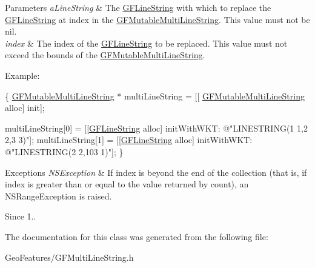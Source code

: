 \begin{DoxyParams}{Parameters}
{\em a\+Line\+String} & The \hyperlink{interface_g_f_line_string}{G\+F\+Line\+String} with which to replace the \hyperlink{interface_g_f_line_string}{G\+F\+Line\+String} at index in the \hyperlink{interface_g_f_mutable_multi_line_string}{G\+F\+Mutable\+Multi\+Line\+String}. This value must not be nil. \\
\hline
{\em index} & The index of the \hyperlink{interface_g_f_line_string}{G\+F\+Line\+String} to be replaced. This value must not exceed the bounds of the \hyperlink{interface_g_f_mutable_multi_line_string}{G\+F\+Mutable\+Multi\+Line\+String}.\\
\hline
\end{DoxyParams}
Example\+:


\begin{DoxyCode}
\{
   \hyperlink{interface_g_f_mutable_multi_line_string}{GFMutableMultiLineString} * multiLineString = [[
      \hyperlink{interface_g_f_mutable_multi_line_string}{GFMutableMultiLineString} alloc] init];

   multiLineString[0] = [[\hyperlink{interface_g_f_line_string}{GFLineString} alloc] initWithWKT: \textcolor{stringliteral}{@"LINESTRING(1 1,2 2,3 3)"}];
   multiLineString[1] = [[\hyperlink{interface_g_f_line_string}{GFLineString} alloc] initWithWKT: \textcolor{stringliteral}{@"LINESTRING(2 2,103 1)"}];
\}
\end{DoxyCode}



\begin{DoxyExceptions}{Exceptions}
{\em N\+S\+Exception} & If index is beyond the end of the collection (that is, if index is greater than or equal to the value returned by count), an N\+S\+Range\+Exception is raised.\\
\hline
\end{DoxyExceptions}
\begin{DoxySince}{Since}
1.. 
\end{DoxySince}


The documentation for this class was generated from the following file\+:\begin{DoxyCompactItemize}
\item 
Geo\+Features/G\+F\+Multi\+Line\+String.\+h\end{DoxyCompactItemize}
